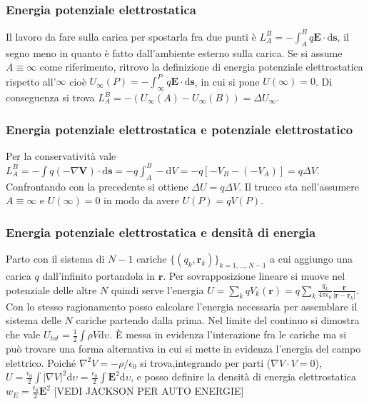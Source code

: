 \documentclass[11pt,a4paper]{article}
\newcommand{\de}{\mathrm d}
\begin{document}
\subsubsection{Energia potenziale elettrostatica}
Il lavoro da fare sulla carica per spostarla fra due punti è $ L_A^B = -\int_A^B q \mathbf E \cdot \de\mathbf s$, il segno meno in quanto è fatto dall'ambiente esterno sulla carica. Se si assume $A \equiv \infty$ come riferimento, ritrovo la definizione di energia potenziale elettrostatica rispetto all'$\infty$ cioè $U_\infty(P) = -\int_\infty^P q \mathbf E \cdot \de\mathbf s$, in cui si pone $U(\infty) = 0$. Di conseguenza si trova $ L_A^B = -(U_\infty(A) - U_\infty(B)) = \Delta U_\infty$.

\subsubsection{Energia potenziale elettrostatica e potenziale elettrostatico}
Per la conservatività vale $ L_A^B = -\int q (-\nabla\mathbf V) \cdot \de\mathbf s = -q\int_A^B -\de V = -q [-V_B - (-V_A)] = q \Delta V$. Confrontando con la precedente si ottiene $\Delta U = q \Delta V$. Il trucco sta nell'assumere $A \equiv \infty$ e $U(\infty) = 0$ in modo da avere $U(P) = q V(P)$.

\subsubsection{Energia potenziale elettrostatica e densità di energia}
Parto con il sistema di $N-1$ cariche $\{(q_k, \mathbf r_k)\}_{k=1,\ldots,N-1}$ a cui aggiungo una carica $q$ dall'infinito portandola in $\mathbf r$. Per sovrapposizione lineare si muove nel potenziale delle altre $N$ quindi serve l'energia $U = \sum_k q V_k(\mathbf r) = q \sum_k \frac{q_k} {4\pi\epsilon_0} \frac{ \mathbf r}{|\mathbf r - \mathbf r_k|}$. Con lo stesso ragionamento posso calcolare l'energia necessaria per assemblare il sistema delle $N$ cariche partendo dalla prima. Nel limite del continuo si dimostra che vale $U_{tot} = \frac12 \int \rho V \de\upsilon$. È messa in evidenza l'interazione fra le cariche ma si può trovare una forma alternativa in cui si mette in evidenza l'energia del campo elettrico. Poiché $\nabla^2 V = -\rho/\epsilon_0$ si trova,integrando per parti ($\nabla V \cdot V = 0$), $U = \frac{\epsilon_0}2 \int |\nabla V|^2 \de\upsilon = \frac{\epsilon_0}2 \int \mathbf E^2 \de\upsilon$, e posso definire la densità di energia elettrostatica $w_E = \frac{\epsilon_0}2 \mathbf E^2$ [VEDI JACKSON PER AUTO ENERGIE]
\end{document}

